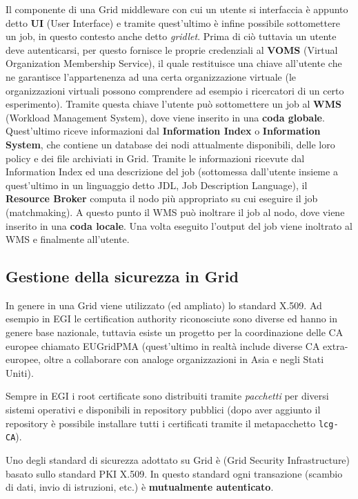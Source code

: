 \documentclass[italian,]{article}
\begin{document}
Il componente di una Grid middleware con cui un utente si interfaccia è
appunto detto \textbf{UI} (User Interface) e tramite quest'ultimo è
infine possibile sottomettere un job, in questo contesto anche detto
\emph{gridlet}. Prima di ciò tuttavia un utente deve autenticarsi, per
questo fornisce le proprie credenziali al \textbf{VOMS} (Virtual
Organization Membership Service), il quale restituisce una chiave
all'utente che ne garantisce l'appartenenza ad una certa organizzazione
virtuale (le organizzazioni virtuali possono comprendere ad esempio i
ricercatori di un certo esperimento). Tramite questa chiave l'utente può
sottomettere un job al \textbf{WMS} (Workload Management System), dove
viene inserito in una \textbf{coda globale}. Quest'ultimo riceve
informazioni dal \textbf{Information Index} o \textbf{Information
System}, che contiene un database dei nodi attualmente disponibili,
delle loro policy e dei file archiviati in Grid. Tramite le informazioni
ricevute dal Information Index ed una descrizione del job (sottomessa
dall'utente insieme a quest'ultimo in un linguaggio detto JDL, Job
Description Language), il \textbf{Resource Broker} computa il nodo più
appropriato su cui eseguire il job (matchmaking). A questo punto il WMS
può inoltrare il job al nodo, dove viene inserito in una \textbf{coda
locale}. Una volta eseguito l'output del job viene inoltrato al WMS e
finalmente all'utente.

\subsection{Gestione della sicurezza in
Grid}\label{gestione-della-sicurezza-in-grid}

In genere in una Grid viene utilizzato (ed ampliato) lo standard X.509.
Ad esempio in EGI le certification authority riconosciute sono diverse
ed hanno in genere base nazionale, tuttavia esiste un progetto per la
coordinazione delle CA europee chiamato EUGridPMA (quest'ultimo in
realtà include diverse CA extra-europee, oltre a collaborare con analoge
organizzazioni in Asia e negli Stati Uniti).

Sempre in EGI i root certificate sono distribuiti tramite
\emph{pacchetti} per diversi sistemi operativi e disponibili in
repository pubblici (dopo aver aggiunto il repository è possibile
installare tutti i certificati tramite il metapacchetto
\texttt{lcg-CA}).

Uno degli standard di sicurezza adottato su Grid è (Grid Security
Infrastructure) basato sullo standard PKI X.509. In questo standard ogni
transazione (scambio di dati, invio di istruzioni, etc.) è
\textbf{mutualmente autenticato}.
\end{document}
